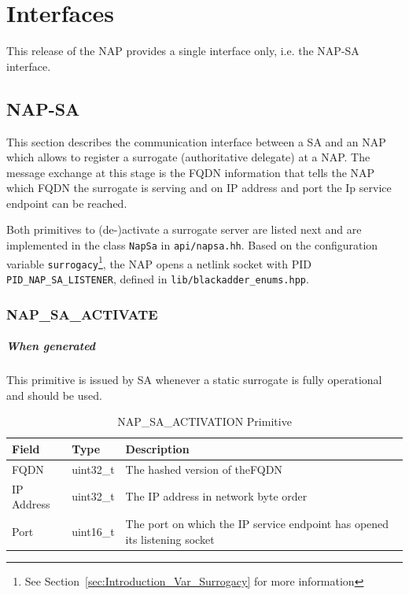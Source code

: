 \documentclass[a4paper,11pt,titlepage]{report}
\begin{document}
\chapter{Interfaces}
This release of the \ac{NAP} provides a single interface only, i.e. the \ac{NAP}-\ac{SA} interface.
\section{NAP-SA}
This section describes the communication interface between a \ac{SA} and an \ac{NAP} which allows to register a surrogate (authoritative delegate) at a \ac{NAP}. The message exchange at this stage is the \ac{FQDN} information that tells the \ac{NAP} which \ac{FQDN} the surrogate is serving and on IP address and port the Ip service endpoint can be reached.

Both primitives to (de-)activate a surrogate server are listed next and are implemented in the class \texttt{NapSa} in \texttt{api/napsa.hh}. Based on the configuration variable \texttt{surrogacy}\footnote{See Section~\ref{sec:Introduction_Var_Surrogacy} for more information}, the \ac{NAP} opens a netlink socket with \ac{PID} \texttt{PID\_NAP\_SA\_LISTENER}, defined in \texttt{lib/blackadder\_enums.hpp}.

\subsection{NAP\_SA\_ACTIVATE}

\paragraph{When generated} This primitive is issued by SA whenever a static surrogate is fully operational and should be used.

\begin{table}[h]
	\centering
	\caption{NAP\_SA\_ACTIVATION Primitive}\label{tab:NAP_SA_Activate}
\begin{tabular}{| p{} | p{} | p{}|}
	\hline \textbf{Field} & \textbf{Type} & \textbf{Description} \\
	\hline FQDN & uint32\_t & The hashed version of the\acl{FQDN} \\ 
	\hline IP Address & uint32\_t & The IP address in network byte order \\ 
	\hline Port & uint16\_t & The port on which the IP service endpoint has opened its listening socket \\ 
	\hline 
\end{tabular} 
\end{table}
\end{document}
